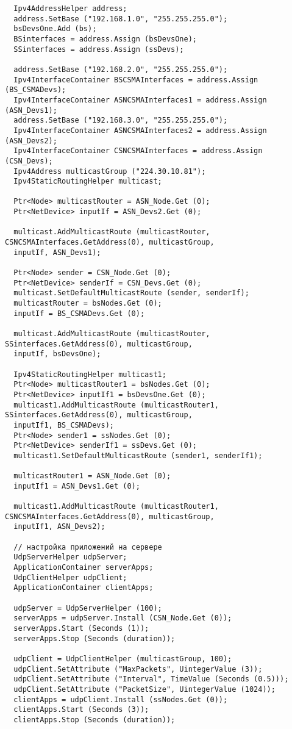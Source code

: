\documentclass[14pt,a4paper]{article}
\begin{document}
{\begin{verbatim}
  Ipv4AddressHelper address;
  address.SetBase ("192.168.1.0", "255.255.255.0");
  bsDevsOne.Add (bs);
  BSinterfaces = address.Assign (bsDevsOne);
  SSinterfaces = address.Assign (ssDevs);

  address.SetBase ("192.168.2.0", "255.255.255.0");
  Ipv4InterfaceContainer BSCSMAInterfaces = address.Assign (BS_CSMADevs);
  Ipv4InterfaceContainer ASNCSMAInterfaces1 = address.Assign (ASN_Devs1);
  address.SetBase ("192.168.3.0", "255.255.255.0");
  Ipv4InterfaceContainer ASNCSMAInterfaces2 = address.Assign (ASN_Devs2);
  Ipv4InterfaceContainer CSNCSMAInterfaces = address.Assign (CSN_Devs);
  Ipv4Address multicastGroup ("224.30.10.81");
  Ipv4StaticRoutingHelper multicast;
  
  Ptr<Node> multicastRouter = ASN_Node.Get (0); 
  Ptr<NetDevice> inputIf = ASN_Devs2.Get (0); 

  multicast.AddMulticastRoute (multicastRouter, CSNCSMAInterfaces.GetAddress(0), multicastGroup, 
  inputIf, ASN_Devs1);

  Ptr<Node> sender = CSN_Node.Get (0);
  Ptr<NetDevice> senderIf = CSN_Devs.Get (0);
  multicast.SetDefaultMulticastRoute (sender, senderIf);
  multicastRouter = bsNodes.Get (0); 
  inputIf = BS_CSMADevs.Get (0); 

  multicast.AddMulticastRoute (multicastRouter, SSinterfaces.GetAddress(0), multicastGroup, 
  inputIf, bsDevsOne);

  Ipv4StaticRoutingHelper multicast1;
  Ptr<Node> multicastRouter1 = bsNodes.Get (0); 
  Ptr<NetDevice> inputIf1 = bsDevsOne.Get (0); 
  multicast1.AddMulticastRoute (multicastRouter1, SSinterfaces.GetAddress(0), multicastGroup, 
  inputIf1, BS_CSMADevs);
  Ptr<Node> sender1 = ssNodes.Get (0);
  Ptr<NetDevice> senderIf1 = ssDevs.Get (0);
  multicast1.SetDefaultMulticastRoute (sender1, senderIf1);

  multicastRouter1 = ASN_Node.Get (0); 
  inputIf1 = ASN_Devs1.Get (0); 

  multicast1.AddMulticastRoute (multicastRouter1, CSNCSMAInterfaces.GetAddress(0), multicastGroup, 
  inputIf1, ASN_Devs2);

  // настройка приложений на сервере
  UdpServerHelper udpServer;
  ApplicationContainer serverApps;
  UdpClientHelper udpClient;
  ApplicationContainer clientApps;

  udpServer = UdpServerHelper (100);
  serverApps = udpServer.Install (CSN_Node.Get (0));
  serverApps.Start (Seconds (1));
  serverApps.Stop (Seconds (duration));

  udpClient = UdpClientHelper (multicastGroup, 100);
  udpClient.SetAttribute ("MaxPackets", UintegerValue (3));
  udpClient.SetAttribute ("Interval", TimeValue (Seconds (0.5)));
  udpClient.SetAttribute ("PacketSize", UintegerValue (1024));
  clientApps = udpClient.Install (ssNodes.Get (0));
  clientApps.Start (Seconds (3));
  clientApps.Stop (Seconds (duration));


\end{verbatim}}
\end{document}
